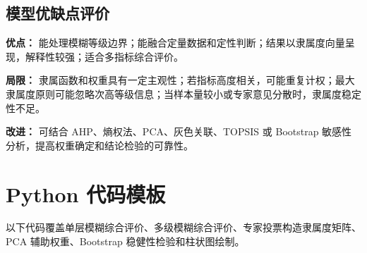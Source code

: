 \documentclass[UTF8,zihao=-4,fontset=none]{ctexart}
\begin{document}
\subsection{模型优缺点评价}
\textbf{优点：} 能处理模糊等级边界；能融合定量数据和定性判断；结果以隶属度向量呈现，解释性较强；适合多指标综合评价。

\textbf{局限：} 隶属函数和权重具有一定主观性；若指标高度相关，可能重复计权；最大隶属度原则可能忽略次高等级信息；当样本量较小或专家意见分散时，隶属度稳定性不足。

\textbf{改进：} 可结合 AHP、熵权法、PCA、灰色关联、TOPSIS 或 Bootstrap 敏感性分析，提高权重确定和结论检验的可靠性。

\section{Python 代码模板}
以下代码覆盖单层模糊综合评价、多级模糊综合评价、专家投票构造隶属度矩阵、PCA 辅助权重、Bootstrap 稳健性检验和柱状图绘制。
\end{document}
